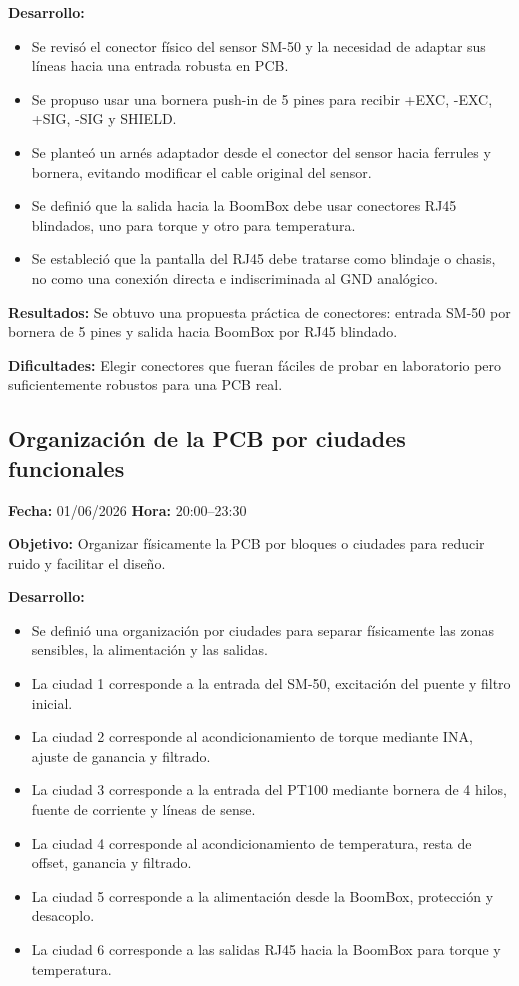 \documentclass[12pt]{article}
\begin{document}
\textbf{Desarrollo:}
\begin{itemize}
\item Se revisó el conector físico del sensor SM-50 y la necesidad de adaptar sus líneas hacia una entrada robusta en PCB.
\item Se propuso usar una bornera push-in de 5 pines para recibir +EXC, -EXC, +SIG, -SIG y SHIELD.
\item Se planteó un arnés adaptador desde el conector del sensor hacia ferrules y bornera, evitando modificar el cable original del sensor.
\item Se definió que la salida hacia la BoomBox debe usar conectores RJ45 blindados, uno para torque y otro para temperatura.
\item Se estableció que la pantalla del RJ45 debe tratarse como blindaje o chasis, no como una conexión directa e indiscriminada al GND analógico.
\end{itemize}

\textbf{Resultados:}
Se obtuvo una propuesta práctica de conectores: entrada SM-50 por bornera de 5 pines y salida hacia BoomBox por RJ45 blindado.

\textbf{Dificultades:}
Elegir conectores que fueran fáciles de probar en laboratorio pero suficientemente robustos para una PCB real.

\subsection{Organización de la PCB por ciudades funcionales}
\textbf{Fecha:} 01/06/2026 \quad \textbf{Hora:} 20:00--23:30

\textbf{Objetivo:}
Organizar físicamente la PCB por bloques o ciudades para reducir ruido y facilitar el diseño.

\textbf{Desarrollo:}
\begin{itemize}
\item Se definió una organización por ciudades para separar físicamente las zonas sensibles, la alimentación y las salidas.
\item La ciudad 1 corresponde a la entrada del SM-50, excitación del puente y filtro inicial.
\item La ciudad 2 corresponde al acondicionamiento de torque mediante INA, ajuste de ganancia y filtrado.
\item La ciudad 3 corresponde a la entrada del PT100 mediante bornera de 4 hilos, fuente de corriente y líneas de sense.
\item La ciudad 4 corresponde al acondicionamiento de temperatura, resta de offset, ganancia y filtrado.
\item La ciudad 5 corresponde a la alimentación desde la BoomBox, protección y desacoplo.
\item La ciudad 6 corresponde a las salidas RJ45 hacia la BoomBox para torque y temperatura.
\end{itemize}
\end{document}
